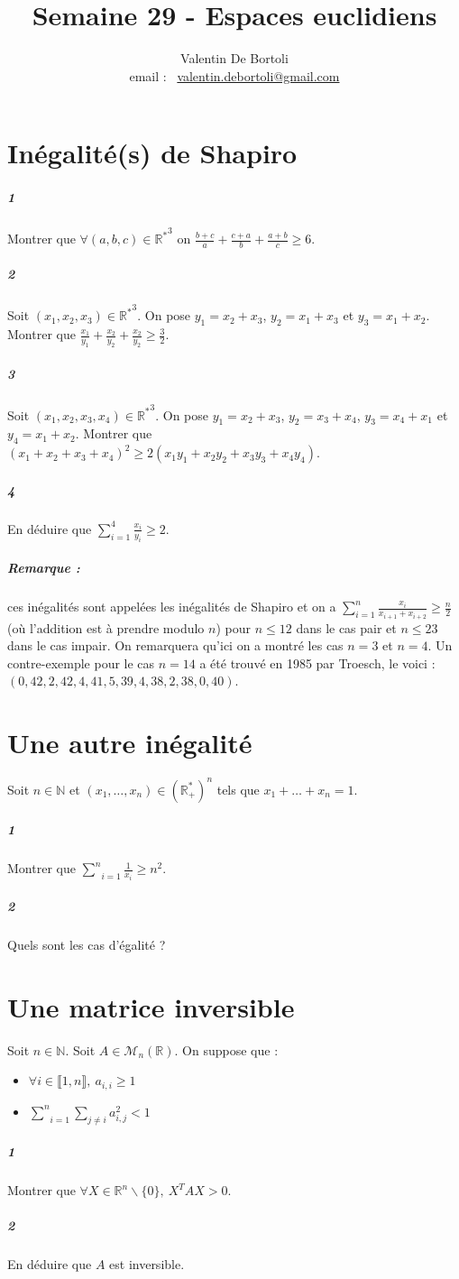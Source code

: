 \documentclass[10pt,a4paper]{article}
\title{Semaine 29 - Espaces euclidiens}
\author{Valentin De Bortoli \\ email : \ \href{mailto:valentin.debortoli@gmail.com}{valentin.debortoli@gmail.com}}
\date{}
\begin{document}
\maketitle
\section{Inégalité(s) de Shapiro}
\subparagraph{1}Montrer que $\forall (a,b,c) \in {\mathbb{R}^*}^3$ on  $\frac{b+c}{a}+\frac{c+a}{b}+\frac{a+b}{c} \ge 6$.
\subparagraph{2}Soit $(x_1,x_2,x_3)\in {\mathbb{R}^*}^3$. On pose $y_1=x_2+x_3$, $y_2=x_1+x_3$ et $y_3=x_1+x_2$. Montrer que $\frac{x_1}{y_1}+\frac{x_2}{y_2}+\frac{x_2}{y_2} \ge \frac{3}{2}$.
\subparagraph{3} Soit $(x_1,x_2,x_3,x_4)\in {\mathbb{R}^*}^3$. On pose $y_1=x_2+x_3$, $y_2=x_3+x_4$, $y_3=x_4+x_1$ et $y_4=x_1+x_2$. Montrer que $(x_1+x_2+x_3+x_4)^2 \ge 2(x_1 y_1+x_2 y_2 +x_3 y_3+x_4 y_4)$.
\subparagraph{4}En déduire que $\sum_{i=1}^4 \frac{x_i}{y_i} \ge 2$.
\subparagraph{Remarque :} ces inégalités sont appelées les inégalités de Shapiro et on a $\sum_{i=1}^n \frac{x_i}{x_{i+1}+x_{i+2}} \ge \frac{n}{2}$ (où l'addition est à prendre modulo $n$) pour $n \le 12 $ dans le cas pair et $n \le 23$ dans le cas impair. On remarquera qu'ici on a montré les cas $n=3$ et $n=4$. Un contre-exemple pour le cas $n=14$ a été trouvé en 1985 par Troesch, le voici : $(0, 42, 2, 42, 4, 41, 5, 39, 4, 38, 2, 38, 0, 40)$.

\section{Une autre inégalité}
Soit $n \in \mathbb{N}$ et $(x_1, \dots, x_n) \in \left( \mathbb{R}_+^* \right)^n$ tels que $x_1 + \dots + x_n = 1$.
\subparagraph{1}Montrer que $\underset{i=1}{\overset{n}{\sum}} \frac{1}{x_i} \ge n^2$.
\subparagraph{2}Quels sont les cas d'égalité ?
\section{Une matrice inversible}
Soit $n \in \mathbb{N}$. Soit $A \in \mathcal{M}_n\left( \mathbb{R} \right)$. On suppose que :
\begin{itemize}
\item $\forall i \in \llbracket 1,n \rrbracket, \ a_{i,i} \ge 1$
\item $\underset{i=1}{\overset{n}{\sum}} \underset{j \neq i}{\sum} a_{i,j}^2 <1$
\end{itemize}
\subparagraph{1}Montrer que $\forall X \in \mathbb{R}^n \backslash \lbrace 0 \rbrace, \ X^T A X > 0$.
\subparagraph{2}En déduire que $A$ est inversible.
\end{document}
